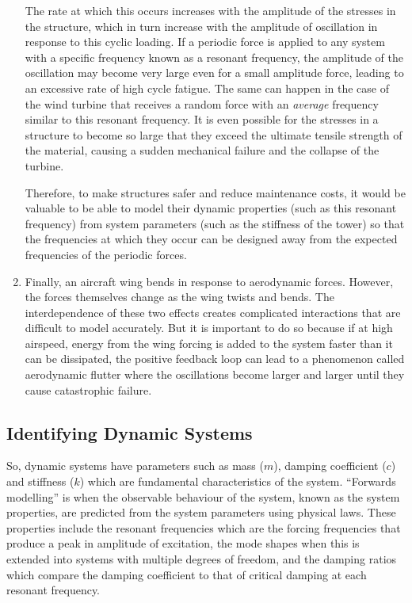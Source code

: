 \documentclass[12pt]{article}
\begin{document}
\begin{enumerate}[listparindent=\parindent]
        The rate at which this occurs increases with the amplitude of the stresses in the structure, which in turn increase with the amplitude of oscillation in response to this cyclic loading.
        If a periodic force is applied to any system with a specific frequency known as a resonant frequency, the amplitude of the oscillation may become very large even for a small amplitude force, leading to an excessive rate of high cycle fatigue.
        The same can happen in the case of the wind turbine that receives a random force with an \textit{average} frequency similar to this resonant frequency.
        It is even possible for the stresses in a structure to become so large that they exceed the ultimate tensile strength of the material, causing a sudden mechanical failure and the collapse of the turbine.

        Therefore, to make structures safer and reduce maintenance costs, it would be valuable to be able to model their dynamic properties (such as this resonant frequency) from system parameters (such as the stiffness of the tower) so that the frequencies at which they occur can be designed away from the expected frequencies of the periodic forces.

        \item Finally, an aircraft wing bends in response to aerodynamic forces.
        However, the forces themselves change as the wing twists and bends.
        The interdependence of these two effects creates complicated interactions that are difficult to model accurately.
        But it is important to do so because if at high airspeed, energy from the wing forcing is added to the system faster than it can be dissipated, the positive feedback loop can lead to a phenomenon called aerodynamic flutter where the oscillations become larger and larger until they cause catastrophic failure.
    \end{enumerate}

    \subsection{Identifying Dynamic Systems}

    So, dynamic systems have parameters such as mass ($m$), damping coefficient ($c$) and stiffness ($k$) which are fundamental characteristics of the system.
    ``Forwards modelling'' is when the observable behaviour of the system, known as the system properties, are predicted from the system parameters using physical laws.
    These properties include the resonant frequencies which are the forcing frequencies that produce a peak in amplitude of excitation, the mode shapes when this is extended into systems with multiple degrees of freedom, and the damping ratios which compare the damping coefficient to that of critical damping at each resonant frequency.
\end{document}
